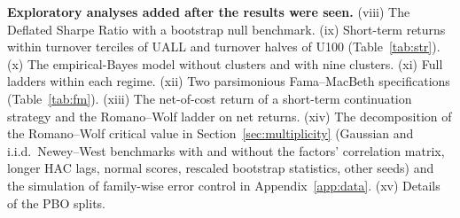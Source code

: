 \documentclass[11pt]{article}
\newcommand{\RW}{Romano--Wolf}
\begin{document}
\textbf{Exploratory analyses added after the results were seen.} (viii) The Deflated Sharpe Ratio with a bootstrap
null benchmark. (ix) Short-term returns within turnover terciles of UALL and turnover halves of U100
(Table~\ref{tab:str}). (x) The empirical-Bayes model without clusters and with nine clusters. (xi) Full ladders within
each regime. (xii) Two parsimonious Fama--MacBeth specifications (Table~\ref{tab:fm}). (xiii) The net-of-cost return of a
short-term continuation strategy and the \RW{} ladder on net returns. (xiv) The decomposition of the \RW{} critical
value in Section~\ref{sec:multiplicity} (Gaussian and i.i.d.\ Newey--West benchmarks with and without the factors'
correlation matrix, longer HAC lags, normal scores, rescaled bootstrap statistics, other seeds)
and the simulation of family-wise error control in Appendix~\ref{app:data}. (xv) Details of the PBO splits.
\end{document}
